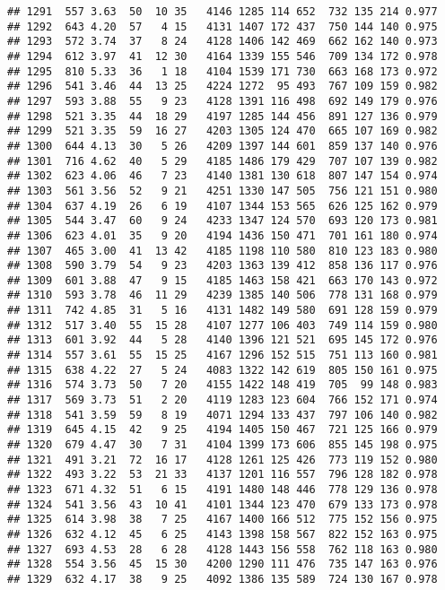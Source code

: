 \documentclass[]{article}
\begin{document}
\begin{verbatim}
## 1291  557 3.63  50  10 35   4146 1285 114 652  732 135 214 0.977
## 1292  643 4.20  57   4 15   4131 1407 172 437  750 144 140 0.975
## 1293  572 3.74  37   8 24   4128 1406 142 469  662 162 140 0.973
## 1294  612 3.97  41  12 30   4164 1339 155 546  709 134 172 0.978
## 1295  810 5.33  36   1 18   4104 1539 171 730  663 168 173 0.972
## 1296  541 3.46  44  13 25   4224 1272  95 493  767 109 159 0.982
## 1297  593 3.88  55   9 23   4128 1391 116 498  692 149 179 0.976
## 1298  521 3.35  44  18 29   4197 1285 144 456  891 127 136 0.979
## 1299  521 3.35  59  16 27   4203 1305 124 470  665 107 169 0.982
## 1300  644 4.13  30   5 26   4209 1397 144 601  859 137 140 0.976
## 1301  716 4.62  40   5 29   4185 1486 179 429  707 107 139 0.982
## 1302  623 4.06  46   7 23   4140 1381 130 618  807 147 154 0.974
## 1303  561 3.56  52   9 21   4251 1330 147 505  756 121 151 0.980
## 1304  637 4.19  26   6 19   4107 1344 153 565  626 125 162 0.979
## 1305  544 3.47  60   9 24   4233 1347 124 570  693 120 173 0.981
## 1306  623 4.01  35   9 20   4194 1436 150 471  701 161 180 0.974
## 1307  465 3.00  41  13 42   4185 1198 110 580  810 123 183 0.980
## 1308  590 3.79  54   9 23   4203 1363 139 412  858 136 117 0.976
## 1309  601 3.88  47   9 15   4185 1463 158 421  663 170 143 0.972
## 1310  593 3.78  46  11 29   4239 1385 140 506  778 131 168 0.979
## 1311  742 4.85  31   5 16   4131 1482 149 580  691 128 159 0.979
## 1312  517 3.40  55  15 28   4107 1277 106 403  749 114 159 0.980
## 1313  601 3.92  44   5 28   4140 1396 121 521  695 145 172 0.976
## 1314  557 3.61  55  15 25   4167 1296 152 515  751 113 160 0.981
## 1315  638 4.22  27   5 24   4083 1322 142 619  805 150 161 0.975
## 1316  574 3.73  50   7 20   4155 1422 148 419  705  99 148 0.983
## 1317  569 3.73  51   2 20   4119 1283 123 604  766 152 171 0.974
## 1318  541 3.59  59   8 19   4071 1294 133 437  797 106 140 0.982
## 1319  645 4.15  42   9 25   4194 1405 150 467  721 125 166 0.979
## 1320  679 4.47  30   7 31   4104 1399 173 606  855 145 198 0.975
## 1321  491 3.21  72  16 17   4128 1261 125 426  773 119 152 0.980
## 1322  493 3.22  53  21 33   4137 1201 116 557  796 128 182 0.978
## 1323  671 4.32  51   6 15   4191 1480 148 446  778 129 136 0.978
## 1324  541 3.56  43  10 41   4101 1344 123 470  679 133 173 0.978
## 1325  614 3.98  38   7 25   4167 1400 166 512  775 152 156 0.975
## 1326  632 4.12  45   6 25   4143 1398 158 567  822 152 163 0.975
## 1327  693 4.53  28   6 28   4128 1443 156 558  762 118 163 0.980
## 1328  554 3.56  45  15 30   4200 1290 111 476  735 147 163 0.976
## 1329  632 4.17  38   9 25   4092 1386 135 589  724 130 167 0.978

\end{verbatim}
\end{document}
